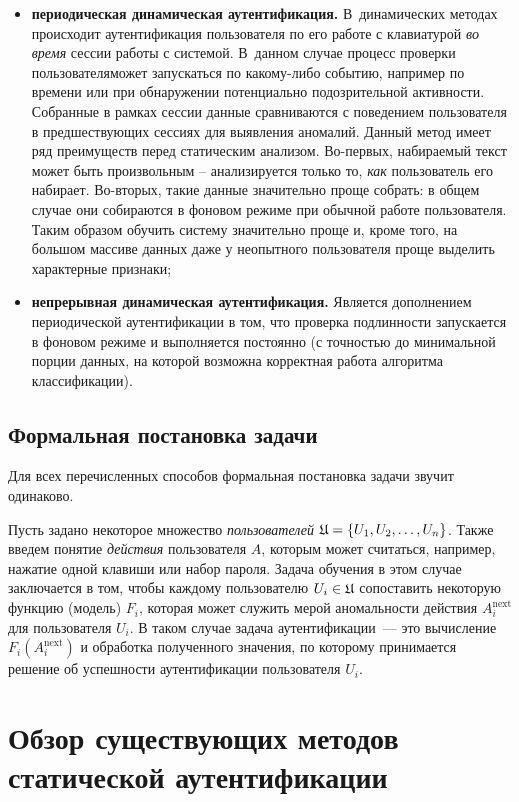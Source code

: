 \begin{multicols}{2}
\begin{itemize}
    \item \textbf{периодическая динамическая аутентификация.} В~динамических методах 
    происходит аутентификация пользователя по его работе с клавиатурой \textit{во время} 
    сессии работы с системой. В~данном случае процесс проверки пользователя\linebreak \mbox{может} 
    запускаться по какому-либо событию, например по времени или при обнаружении 
    потенциально подозрительной активности. Собранные в рамках сессии данные сравниваются с поведением пользователя в предшествующих сессиях для выявления аномалий. Данный метод имеет ряд преимуществ перед статическим анализом. Во-первых, набираемый текст может быть произвольным -- анализируется только то, \textit{как} пользователь его набирает. Во-вторых, такие данные значительно проще собрать: в общем случае они собираются в фоновом режиме при обычной работе пользователя. Таким образом обучить систему значительно проще и, кроме того, на большом массиве данных даже у неопытного пользователя проще выделить характерные признаки;
    \item \textbf{непрерывная динамическая аутентификация.} Является дополнением 
    периодической аутентификации в том, что проверка подлинности запускается в 
    фоновом режиме и выполняется постоянно (с точностью до минимальной порции данных, 
    на которой возможна корректная работа алгоритма классификации).
\end{itemize}

\subsection{Формальная постановка задачи}
Для всех перечисленных способов формальная постановка задачи звучит одинаково.

Пусть задано некоторое множество {\it пользователей} $ \mathfrak{U}
\hm= \{U_1, U_2, \ldots , U_n\}$. Также введем понятие {\it действия}
пользователя $A$, которым может считаться, например, нажатие одной
клавиши или набор пароля. Задача обучения в этом случае заключается
в том, чтобы  каждому пользователю $U_i\hm \in \mathfrak{U} $
сопоставить некоторую функцию (модель) $F_i$, которая может служить
мерой аномальности действия $A^{\mathrm{next}}_i$ для пользователя
$U_i$. В таком случае задача аутентификации~--- это вычисление
$F_i(A^{\mathrm{next}}_i)$ и обработка полученного значения, по
которому принимается решение об успешности аутентификации
пользователя $U_i$.

\section{Обзор существующих методов статической аутентификации}


\end{multicols}
